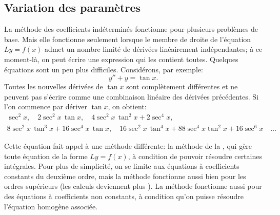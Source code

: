 \subsection{Variation des paramètres}

La méthode des coefficients indéterminés fonctionne pour plusieurs problèmes de base. Mais elle fonctionne seulement lorsque le membre de droite de l'équation  $Ly = f(x)$ 
admet un nombre limité de dérivées linéairement indépendantes; à ce moment-là, on peut écrire une expression qui les contient toutes. Quelques équations sont un peu plus difficiles. Considérons, par exemple: 
\begin{equation*}
	y''+y = \tan x .
\end{equation*}
Toutes les nouvelles dérivées de $\tan x$ sont complètement différentes et ne peuvent pas s'écrire comme une combinaison linéaire des dérivées précédentes. Si l'on commence par dériver  $\tan x$, on obtient:
\begin{multline*}
 	  \sec^2 x, \quad
	2 \sec^2 x \, \tan x, \quad
	4 \sec^2 x \, \tan^2 x + 2 \sec^4 x, \\
	8 \sec^2 x \, \tan^3 x + 16 \sec^4 x \, \tan x, \quad
	16\sec^2 x \, \tan^4 x + 88 \sec^4 x \tan^2 x + 16 \sec^6 x \quad
	\ldots
\end{multline*}

Cette équation fait appel à une méthode différente: la méthode de la
\emph{}, qui gère toute équation de
la forme $Ly = f(x)$, à condition de pouvoir résoudre certaines intégrales.  
Pour plus de simplicité, on se limite  aux équations à coefficients constants du deuxième ordre,
mais la méthode fonctionne aussi bien pour les ordres supérieurs (les calculs deviennent plus
). %
La méthode fonctionne aussi pour des équations à coefficients non constants, 
à condition qu'on puisse résoudre l'équation homogène associée.  

